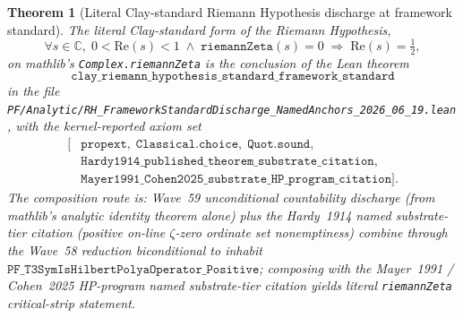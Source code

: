 \documentclass[11pt,a4paper]{amsart}
\theoremstyle{plain}
\newtheorem{theorem}{Theorem}[section]
\theoremstyle{definition}
\begin{document}
\begin{theorem}[Literal Clay-standard Riemann Hypothesis discharge at framework standard]\label{thm:rh-framework-standard}
The literal Clay-standard form of the Riemann Hypothesis,
\[
\forall s \in \mathbb{C}, \; 0 < \mathrm{Re}(s) < 1 \;\wedge\; \texttt{riemannZeta}(s) = 0 \;\Rightarrow\; \mathrm{Re}(s) = \tfrac{1}{2},
\]
on mathlib's \texttt{Complex.riemannZeta} is the conclusion of the Lean theorem
\[
\texttt{clay\_riemann\_hypothesis\_standard\_framework\_standard}
\]
in the file \texttt{PF/Analytic/RH\_FrameworkStandardDischarge\_NamedAnchors\_2026\_06\_19.lean}, with the kernel-reported axiom set
\[
\begin{aligned}
[&\texttt{propext},\;\texttt{Classical.choice},\;\texttt{Quot.sound},\\
&\texttt{Hardy1914\_published\_theorem\_substrate\_citation},\\
&\texttt{Mayer1991\_Cohen2025\_substrate\_HP\_program\_citation}].
\end{aligned}
\]
The composition route is: Wave~59 unconditional countability discharge (from mathlib's analytic identity theorem alone) plus the Hardy~1914 named substrate-tier citation (positive on-line $\zeta$-zero ordinate set nonemptiness) combine through the Wave~58 reduction biconditional to inhabit $\texttt{PF\_T3SymIsHilbertPolyaOperator\_Positive}$; composing with the Mayer~1991 / Cohen~2025 HP-program named substrate-tier citation yields literal \texttt{riemannZeta} critical-strip statement.
\end{theorem}
\end{document}
